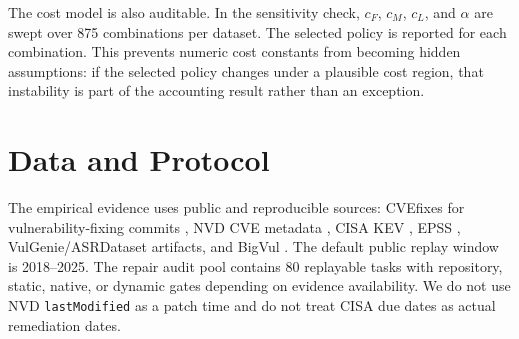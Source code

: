 ﻿\documentclass[lettersize,journal]{IEEEtran}
\begin{document}
The cost model is also auditable. In the sensitivity check, $c_F$, $c_M$, $c_L$, and $\alpha$ are swept over 875 combinations per dataset. The selected policy is reported for each combination. This prevents numeric cost constants from becoming hidden assumptions: if the selected policy changes under a plausible cost region, that instability is part of the accounting result rather than an exception.

\begin{table}[!t]
\caption{Qualification gates used to admit context-derived defense capital}
\label{tab:gate_chain_short}
\centering
\scriptsize
\renewcommand{\arraystretch}{1.15}
\end{table}

\section{Data and Protocol}
The empirical evidence uses public and reproducible sources: CVEfixes for vulnerability-fixing commits \cite{ref_cvefixes}, NVD CVE metadata \cite{ref_nvd}, CISA KEV \cite{ref_kev}, EPSS \cite{ref_epss}, VulGenie/ASRDataset artifacts, and BigVul \cite{ref_bigvul}. The default public replay window is 2018--2025. The repair audit pool contains 80 replayable tasks with repository, static, native, or dynamic gates depending on evidence availability. We do not use NVD \texttt{lastModified} as a patch time and do not treat CISA due dates as actual remediation dates.
\end{document}
